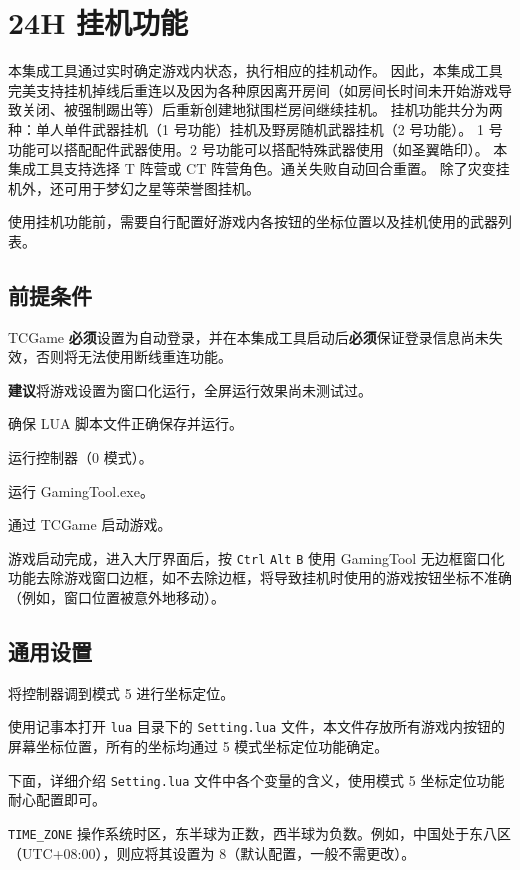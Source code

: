\section{24H 挂机功能}

本集成工具通过实时确定游戏内状态，执行相应的挂机动作。
因此，本集成工具完美支持挂机掉线后重连以及因为各种原因离开房间（如房间长时间未开始游戏导致关闭、被强制踢出等）后重新创建地狱围栏房间继续挂机。
挂机功能共分为两种：单人单件武器挂机（1 号功能）挂机及野房随机武器挂机（2 号功能）。
1 号功能可以搭配配件武器使用。2 号功能可以搭配特殊武器使用（如圣翼皓印）。
本集成工具支持选择 T 阵营或 CT 阵营角色。通关失败自动回合重置。
除了灾变挂机外，还可用于梦幻之星等荣誉图挂机。

使用挂机功能前，需要自行配置好游戏内各按钮的坐标位置以及挂机使用的武器列表。

\subsection{前提条件}

TCGame \textbf{\color{red}必须}设置为自动登录，并在本集成工具启动后\textbf{\color{red}必须}保证登录信息尚未失效，否则将无法使用断线重连功能。

\textbf{\color{red}建议}将游戏设置为窗口化运行，全屏运行效果尚未测试过。

确保 LUA 脚本文件正确保存并运行。

运行控制器（0 模式）。

运行 GamingTool.exe。

通过 TCGame 启动游戏。

游戏启动完成，进入大厅界面后，按 \lstinline{Ctrl} \lstinline{Alt} \lstinline{B} 使用 GamingTool 无边框窗口化功能去除游戏窗口边框，如不去除边框，将导致挂机时使用的游戏按钮坐标不准确（例如，窗口位置被意外地移动）。

\subsection{通用设置}

将控制器调到模式 5 进行坐标定位。

使用记事本打开 \lstinline{lua} 目录下的 \lstinline{Setting.lua} 文件，本文件存放所有游戏内按钮的屏幕坐标位置，所有的坐标均通过 5 模式坐标定位功能确定。

下面，详细介绍 \lstinline{Setting.lua} 文件中各个变量的含义，使用模式 5 坐标定位功能耐心配置即可。

\lstinline{TIME_ZONE} 操作系统时区，东半球为正数，西半球为负数。例如，中国处于东八区（UTC+08:00），则应将其设置为 8（默认配置，一般不需更改）。

